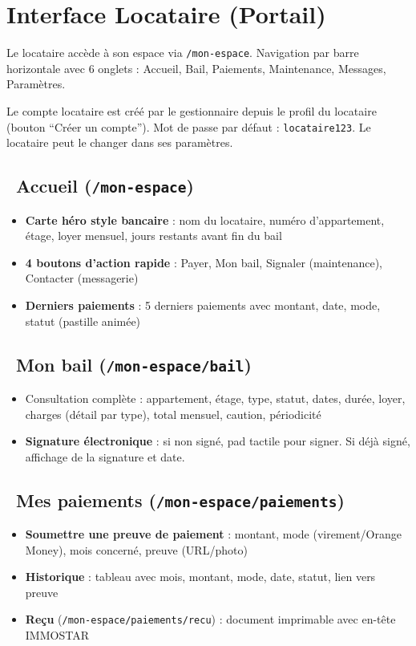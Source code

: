 \documentclass[12pt,a4paper]{article}
\begin{document}
\newpage
\section{Interface Locataire (Portail)}

Le locataire acc\`ede \`a son espace via \texttt{/mon-espace}. Navigation par barre horizontale avec 6 onglets : Accueil, Bail, Paiements, Maintenance, Messages, Param\`etres.

\begin{infobox}
Le compte locataire est cr\'e\'e par le gestionnaire depuis le profil du locataire (bouton ``Cr\'eer un compte''). Mot de passe par d\'efaut : \texttt{locataire123}. Le locataire peut le changer dans ses param\`etres.
\end{infobox}

\subsection{\faHome\ Accueil (\texttt{/mon-espace})}
\begin{itemize}
\item \textbf{Carte h\'ero style bancaire} : nom du locataire, num\'ero d'appartement, \'etage, loyer mensuel, jours restants avant fin du bail
\item \textbf{4 boutons d'action rapide} : Payer, Mon bail, Signaler (maintenance), Contacter (messagerie)
\item \textbf{Derniers paiements} : 5 derniers paiements avec montant, date, mode, statut (pastille anim\'ee)
\end{itemize}

\subsection{\faFileContract\ Mon bail (\texttt{/mon-espace/bail})}
\begin{itemize}
\item Consultation compl\`ete : appartement, \'etage, type, statut, dates, dur\'ee, loyer, charges (d\'etail par type), total mensuel, caution, p\'eriodicit\'e
\item \textbf{Signature \'electronique} : si non sign\'e, pad tactile pour signer. Si d\'ej\`a sign\'e, affichage de la signature et date.
\end{itemize}

\subsection{\faMoneyBill\ Mes paiements (\texttt{/mon-espace/paiements})}
\begin{itemize}
\item \textbf{Soumettre une preuve de paiement} : montant, mode (virement/Orange Money), mois concern\'e, preuve (URL/photo)
\item \textbf{Historique} : tableau avec mois, montant, mode, date, statut, lien vers preuve
\item \textbf{Re\c{c}u} (\texttt{/mon-espace/paiements/recu}) : document imprimable avec en-t\^ete IMMOSTAR
\end{itemize}
\end{document}
